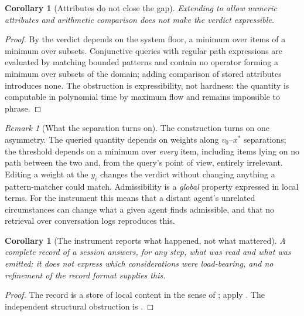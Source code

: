\documentclass[11pt,a4paper]{article}
\theoremstyle{clstyle}
\newtheorem{corollary}[theorem]{Corollary}
\theoremstyle{definition}
\theoremstyle{remark}
\newtheorem{remark}[theorem]{Remark}
\begin{document}
\begin{corollary}[Attributes do not close the gap]
\label{cor:attributed}
Extending  to allow numeric attributes and arithmetic
comparison does not make the verdict expressible.
\end{corollary}

\begin{proof}
By  the verdict depends on the system floor, a minimum
over items of a minimum over subsets. Conjunctive queries with regular path
expressions are evaluated by matching bounded patterns
\citep{perez2009semantics,angles2017foundations} and contain no operator
forming a minimum over subsets of the domain; adding comparison of stored
attributes introduces none. The obstruction is expressibility, not hardness:
the quantity is computable in polynomial time by maximum flow
\citep{fordfulkerson1956maximal,stoer1997simple,edmondskarp1972theoretical}
and remains impossible to phrase.
\end{proof}

\begin{remark}[What the separation turns on]
\label{rem:separation-turns}
The construction turns on one asymmetry. The queried quantity depends on
weights along $v_0$--$x^{*}$ separations; the threshold depends on a minimum
over \emph{every} item, including items lying on no path between the two and,
from the query's point of view, entirely irrelevant. Editing a weight at the
$y_i$ changes the verdict without changing anything a pattern-matcher could
match. Admissibility is a \emph{global} property expressed in local terms.
For the instrument this means that a distant agent's unrelated circumstances
can change what a given agent finds admissible, and that no retrieval over
conversation logs reproduces this.
\end{remark}

\begin{corollary}[The instrument reports what happened, not what mattered]
\label{cor:no-attribution}
A complete record of a session answers, for any step, what was read and what
was emitted; it does not express which considerations were load-bearing, and
no refinement of the record format supplies this.
\end{corollary}

\begin{proof}
The record is a store of local content in the sense of
; apply . The
independent structural obstruction is .
\end{proof}
\end{document}
